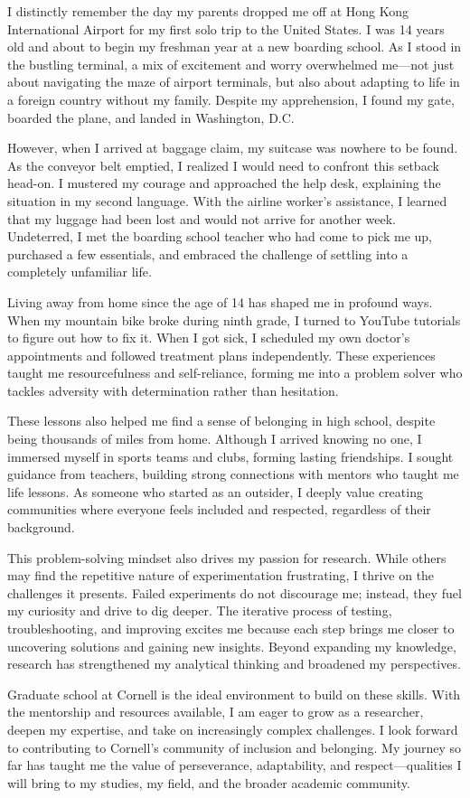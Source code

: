 \documentclass[11pt]{article}
\begin{document}
I distinctly remember the day my parents dropped me off at Hong Kong International Airport for my first solo trip to the United States. I was 14 years old and about to begin my freshman year at a new boarding school. As I stood in the bustling terminal, a mix of excitement and worry overwhelmed me—not just about navigating the maze of airport terminals, but also about adapting to life in a foreign country without my family. Despite my apprehension, I found my gate, boarded the plane, and landed in Washington, D.C.

However, when I arrived at baggage claim, my suitcase was nowhere to be found. As the conveyor belt emptied, I realized I would need to confront this setback head-on. I mustered my courage and approached the help desk, explaining the situation in my second language. With the airline worker's assistance, I learned that my luggage had been lost and would not arrive for another week. Undeterred, I met the boarding school teacher who had come to pick me up, purchased a few essentials, and embraced the challenge of settling into a completely unfamiliar life.

Living away from home since the age of 14 has shaped me in profound ways. When my mountain bike broke during ninth grade, I turned to YouTube tutorials to figure out how to fix it. When I got sick, I scheduled my own doctor's appointments and followed treatment plans independently. These experiences taught me resourcefulness and self-reliance, forming me into a problem solver who tackles adversity with determination rather than hesitation.

These lessons also helped me find a sense of belonging in high school, despite being thousands of miles from home. Although I arrived knowing no one, I immersed myself in sports teams and clubs, forming lasting friendships. I sought guidance from teachers, building strong connections with mentors who taught me life lessons. As someone who started as an outsider, I deeply value creating communities where everyone feels included and respected, regardless of their background.

This problem-solving mindset also drives my passion for research. While others may find the repetitive nature of experimentation frustrating, I thrive on the challenges it presents. Failed experiments do not discourage me; instead, they fuel my curiosity and drive to dig deeper. The iterative process of testing, troubleshooting, and improving excites me because each step brings me closer to uncovering solutions and gaining new insights. Beyond expanding my knowledge, research has strengthened my analytical thinking and broadened my perspectives.

Graduate school at Cornell is the ideal environment to build on these skills. With the mentorship and resources available, I am eager to grow as a researcher, deepen my expertise, and take on increasingly complex challenges. I look forward to contributing to Cornell's community of inclusion and belonging. My journey so far has taught me the value of perseverance, adaptability, and respect—qualities I will bring to my studies, my field, and the broader academic community.
\end{document}

